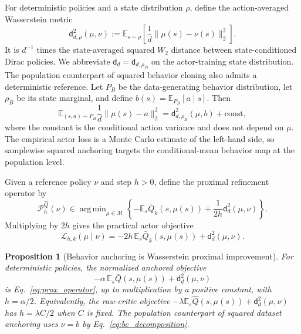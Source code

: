 \documentclass[letterpaper]{article}
\newtheorem{proposition}{Proposition}
\DeclareMathOperator*{\argmin}{arg\,min}
\begin{document}
For deterministic policies and a state distribution $\rho$, define the
action-averaged Wasserstein metric
\begin{equation}
 \mathsf d_{d,\rho}^2(\mu,\nu)
 :=\mathbb E_{s\sim\rho}
 \left[\frac{1}{d}\|\mu(s)-\nu(s)\|_2^2\right].
 \label{eq:mean_metric}
\end{equation}
It is $d^{-1}$ times the state-averaged squared $W_2$ distance between
state-conditioned Dirac policies. We abbreviate
$\mathsf d_d=\mathsf d_{d,\rho_{\mathcal D}}$ on the actor-training state
distribution.
The population counterpart of squared behavior cloning also admits a
deterministic reference. Let $P_{\!B}$ be the data-generating behavior
distribution, let $\rho_B$ be its state marginal, and define
$b(s)=\mathbb E_{P_{\!B}}[a\mid s]$. Then
\begin{equation}
 \mathbb E_{(s,a)\sim P_{\!B}}\frac{1}{d}\|\mu(s)-a\|_2^2
 =\mathsf d_{d,\rho_B}^2(\mu,b)+\mathrm{const},
 \label{eq:bc_decomposition}
\end{equation}
where the constant is the conditional action variance and does not depend on
$\mu$. The empirical actor loss is a Monte Carlo estimate of the left-hand
side, so samplewise squared anchoring targets the conditional-mean behavior map
at the population level.

Given a reference policy $\nu$ and step $h>0$, define the proximal refinement
operator by
\begin{equation}
\mathcal P_{h}^{\widehat Q}(\nu)
\in\argmin_{\mu\in\mathcal M}
\left\{-\mathbb E_s\bar Q_k(s,\mu(s))
+\frac{1}{2h}\mathsf d_d^2(\mu,\nu)\right\}.
\label{eq:prox_operator}
\end{equation}
Multiplying by $2h$ gives the practical actor objective
\begin{equation}
\mathcal L_{h,k}(\mu\mid\nu)
=-2h\,\mathbb E_s\bar Q_k(s,\mu(s))
+\mathsf d_d^2(\mu,\nu).
\label{eq:actorloss}
\end{equation}

\begin{proposition}[Behavior anchoring is Wasserstein proximal improvement]
\label{prop:prox_equiv}
For deterministic policies, the normalized anchored objective
\begin{equation*}
 -\alpha\,\mathbb E_s\bar Q(s,\mu(s))
 +\mathsf d_d^2(\mu,\nu)
\end{equation*}
is Eq.~\eqref{eq:prox_operator}, up to multiplication by a positive constant, with
$h=\alpha/2$. Equivalently, the raw-critic objective
$-\lambda\mathbb E_s\widehat Q(s,\mu(s))+\mathsf d_d^2(\mu,\nu)$ has
$h=\lambda C/2$ when $C$ is fixed. The population counterpart of squared
dataset anchoring uses $\nu=b$ by Eq.~\eqref{eq:bc_decomposition}.
\end{proposition}
\end{document}
